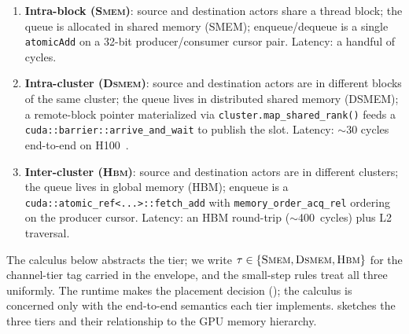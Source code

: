 \begin{enumerate}
\item \textbf{Intra-block (\textsc{Smem})}: source and destination
actors share a thread block; the queue is allocated in shared memory
(SMEM); enqueue/dequeue is a single \texttt{atomicAdd} on a 32-bit
producer/consumer cursor pair.  Latency: a handful of cycles.

\item \textbf{Intra-cluster (\textsc{Dsmem})}: source and destination
actors are in different blocks of the same cluster; the queue lives
in distributed shared memory (DSMEM); a remote-block pointer
materialized via \texttt{cluster.map\_shared\_rank()} feeds a
\texttt{cuda::barrier::arrive\_and\_wait} to publish the slot.
Latency: \(\sim\)30 cycles end-to-end on H100~\citep{nvidia2022hopper}.

\item \textbf{Inter-cluster (\textsc{Hbm})}: source and destination
actors are in different clusters; the queue lives in global memory
(HBM); enqueue is a \texttt{cuda::atomic\_ref<...>::fetch\_add} with
\texttt{memory\_order\_acq\_rel} ordering on the producer cursor.
Latency: an HBM round-trip ($\sim$400~cycles) plus L2 traversal.
\end{enumerate}

The calculus below abstracts the tier; we write \(\tau \in
\{\textsc{Smem}, \textsc{Dsmem}, \textsc{Hbm}\}\) for the
channel-tier tag carried in the envelope, and the small-step rules
treat all three uniformly.  The runtime makes the placement decision
(); the calculus is concerned only with the
end-to-end semantics each tier implements.
 sketches the three tiers and their relationship
to the GPU memory hierarchy.

